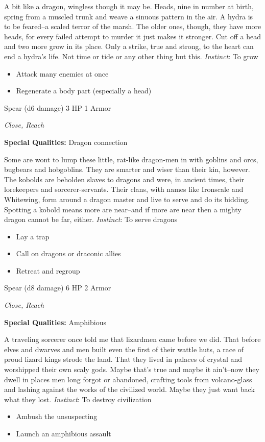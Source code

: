 \HRule
A bit like a dragon, wingless though it may be. Heads, nine in number at birth, spring from a muscled trunk and weave a sinuous pattern in the air. A hydra is to be feared--a scaled terror of the marsh. The older ones, though, they have more heads, for every failed attempt to murder it just makes it stronger. Cut off a head and two more grow in its place. Only a strike, true and strong, to the heart can end a hydra's life. Not time or tide or any other thing but this. \emph{Instinct}: To grow
\begin{itemize}
\item Attack many enemies at once
\item Regenerate a body part (especially a head)
\end{itemize}
\newpage
\HRule
{}

Spear (d6 damage)\hspace*{\fill} 3 HP 1 Armor

\emph{Close, Reach}

\textbf{Special Qualities:}
Dragon connection

\HRule
Some are wont to lump these little, rat-like dragon-men in with goblins and orcs, bugbears and hobgoblins. They are smarter and wiser than their kin, however. The kobolds are beholden slaves to dragons and were, in ancient times, their lorekeepers and sorcerer-servants. Their clans, with names like Ironscale and Whitewing, form around a dragon master and live to serve and do its bidding. Spotting a kobold means more are near--and if more are near then a mighty dragon cannot be far, either. \emph{Instinct}: To serve dragons
\begin{itemize}
\item Lay a trap
\item Call on dragons or draconic allies
\item Retreat and regroup
\end{itemize}

\HRule
{}

Spear (d8 damage)\hspace*{\fill} 6 HP 2 Armor

\emph{Close, Reach}

\textbf{Special Qualities:}
Amphibious

\HRule
A traveling sorcerer once told me that lizardmen came before we did. That before elves and dwarves and men built even the first of their wattle huts, a race of proud lizard kings strode the land. That they lived in palaces of crystal and worshipped their own scaly gods. Maybe that's true and maybe it ain't--now they dwell in places men long forgot or abandoned, crafting tools from volcano-glass and lashing against the works of the civilized world. Maybe they just want back what they lost. \emph{Instinct}: To destroy civilization
\begin{itemize}
\item Ambush the unsuspecting
\item Launch an amphibious assault
\end{itemize}
\newpage
\HRule
{}


